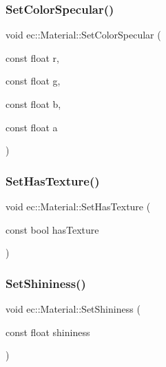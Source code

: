 \mbox{\label{classec_1_1_material_a319ff4ce4891d712c0d49797004d3848}} 
\subsubsection{\texorpdfstring{Set\+Color\+Specular()}{SetColorSpecular()}\hspace{0.1cm}{\footnotesize\ttfamily [2/2]}}
{\footnotesize\ttfamily void ec\+::\+Material\+::\+Set\+Color\+Specular (\begin{DoxyParamCaption}\item[{const float}]{r,  }\item[{const float}]{g,  }\item[{const float}]{b,  }\item[{const float}]{a }\end{DoxyParamCaption})}

\mbox{\label{classec_1_1_material_a4627bb1f7d6a3b9e3a297f16fcdde25a}} 
\subsubsection{\texorpdfstring{Set\+Has\+Texture()}{SetHasTexture()}}
{\footnotesize\ttfamily void ec\+::\+Material\+::\+Set\+Has\+Texture (\begin{DoxyParamCaption}\item[{const bool}]{has\+Texture }\end{DoxyParamCaption})}

\mbox{\label{classec_1_1_material_a04774cb4359499583d69a22ce047f9ba}} 
\subsubsection{\texorpdfstring{Set\+Shininess()}{SetShininess()}}
{\footnotesize\ttfamily void ec\+::\+Material\+::\+Set\+Shininess (\begin{DoxyParamCaption}\item[{const float}]{shininess }\end{DoxyParamCaption})}



